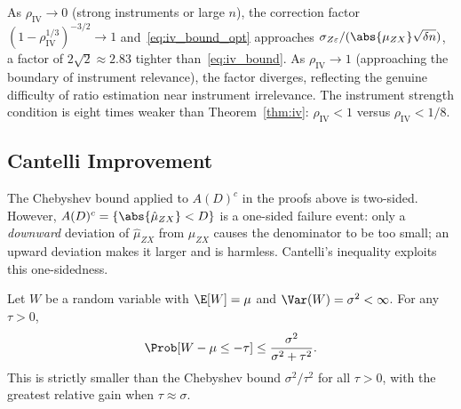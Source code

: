 \begin{remark}
\label{rem:iv_opt_compare}
    As $\rho_\mathrm{IV}\to 0$ (strong instruments or large $n$), the correction factor $(1-\rho_\mathrm{IV}^{1/3})^{-3/2}\to 1$ and~\eqref{eq:iv_bound_opt} approaches $\sigma_{Z\varepsilon}/(\abs{\mu_{ZX}}\sqrt{\delta n})$, a factor of $2\sqrt{2}\approx 2.83$ tighter than~\eqref{eq:iv_bound}. As $\rho_\mathrm{IV}\to 1$ (approaching the boundary of instrument relevance), the factor diverges, reflecting the genuine difficulty of ratio estimation near instrument irrelevance. The instrument strength condition is eight times weaker than Theorem~\ref{thm:iv}: $\rho_\mathrm{IV} < 1$ versus $\rho_\mathrm{IV} < 1/8$.
\end{remark}


\subsection{Cantelli Improvement}
\label{sec:iv_cantelli}

The Chebyshev bound applied to $A(D)^c$ in the proofs above is two-sided. However, $A(D)^c = \{\abs{\hat{\mu}_{ZX}} < D\}$ is a one-sided failure event: only a \emph{downward} deviation of $\hat{\mu}_{ZX}$ from $\mu_{ZX}$ causes the denominator to be too small; an upward deviation makes it larger and is harmless. Cantelli's inequality exploits this one-sidedness.

\begin{lemma}
    \label{lem:cantelli}
    Let $W$ be a random variable with $\E[W]=\mu$ and $\Var(W)=\sigma^2<\infty$.
    For any $\tau>0$,
    \[
        \Prob[W - \mu \leq -\tau] \leq \frac{\sigma^2}{\sigma^2 + \tau^2}.
    \]
    This is strictly smaller than the Chebyshev bound $\sigma^2/\tau^2$ for all $\tau>0$, with the greatest relative gain when $\tau\approx\sigma$.
\end{lemma}

